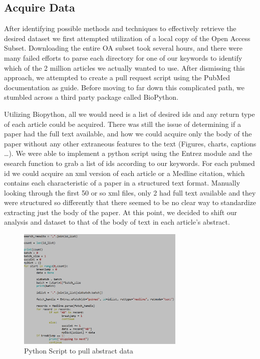 \documentclass{article} %
\begin{document}
\subsection{Acquire Data}
After identifying possible methods and techniques to effectively retrieve the desired dataset we first attempted utilization of a local copy of the Open Access Subset. Downloading the entire OA subset took several hours, and there were many failed efforts to parse each directory for one of our keywords to identify which of the 2 million articles we actually wanted to use. After dismissing this approach, we attempted to create a pull request script using the PubMed documentation as guide. Before moving to far down this complicated path, we stumbled across a third party package called BioPython. 

Utilizing Biopython, all we would need is a list of desired ids and any return type of each article could be acquired. There was still the issue of determining if a paper had the full text available, and how we could acquire only the body of the paper without any other extraneous features to the text (Figures, charts, captions …). We were able to implement a python script using the Entrez module and the esearch function to grab a list of ids according to our keywords. For each pubmed id we could acquire an xml version of each article or a Medline citation, which contains each characteristic of a paper in a structured text format. Manually looking through the first 50 or so xml files, only 2 had full text available and they were structured so differently that there seemed to be no clear way to standardize extracting just the body of the paper. At this point, we decided to shift our analysis and dataset to that of the body of text in each article’s abstract. 

\begin{figure}[h!]
\centering
\includegraphics[width=80mm]{Screenshot_107.png}
\caption{Python Script to pull abstract data}
\end{figure}
\end{document}
